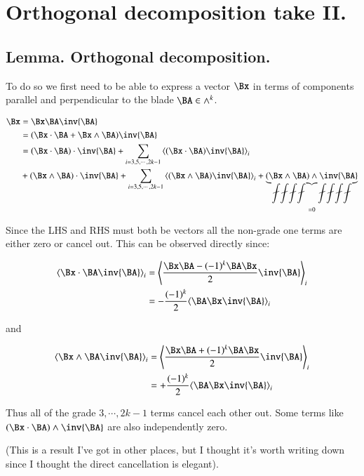 \chapter{Orthogonal decomposition take II.} 
\date{ April 1, 2008.  $RCSfile: orthodecomp.tex,v $ Last $Revision: 1.9 $ $Date: 2009/06/11 16:45:58 $ }
\section{Lemma.  Orthogonal decomposition.}
To do so we first need to be able to express a vector $\Bx$ in terms
of components parallel and perpendicular to the blade $\BA \in \wedge^k$.

\begin{align*}
\Bx 
&= \Bx \BA \inv{\BA} \\
&= (\Bx \cdot \BA + \Bx \wedge \BA) \inv{\BA} \\
&= 
(\Bx \cdot \BA) \cdot \inv{\BA}
+ \sum_{i=3,5,\cdots,2k-1} \gpgrade{(\Bx \cdot \BA) \inv{\BA}}{i} \\
&+ 
(\Bx \wedge \BA) \cdot \inv{\BA}
+ \sum_{i=3,5,\cdots,2k-1} \gpgrade{(\Bx \wedge \BA) \inv{\BA}}{i} 
+ \underbrace{(\Bx \wedge \BA) \wedge \inv{\BA}}_{=0}
\end{align*}

Since the LHS and RHS must both be vectors all the non-grade one terms
are either zero or cancel out.  This can be observed directly since:

\begin{align*}
\gpgrade{\Bx \cdot \BA \inv{\BA}}{i}
&= \gpgrade{ \frac{\Bx \BA - (-1)^{k}\BA\Bx}{2}\inv{\BA} }{i}  \\
&= -\frac{(-1)^{k}}{2} \gpgrade{ \BA\Bx \inv{\BA} }{i}  \\
\end{align*}

and

\begin{align*}
\gpgrade{\Bx \wedge \BA \inv{\BA}}{i} 
&= \gpgrade{ \frac{\Bx \BA + (-1)^{k}\BA\Bx}{2}\inv{\BA} }{i}  \\
&= +\frac{(-1)^{k}}{2} \gpgrade{ \BA\Bx \inv{\BA} }{i}  \\
\end{align*}

Thus all of the grade $3, \cdots ,2k-1$ terms cancel each other out.  Some terms
like $(\Bx \cdot \BA) \wedge \inv{\BA}$ are also independently zero.

(This is a result I've got in other places, but I thought it's worth
 writing down since I thought the direct cancellation is elegant).
